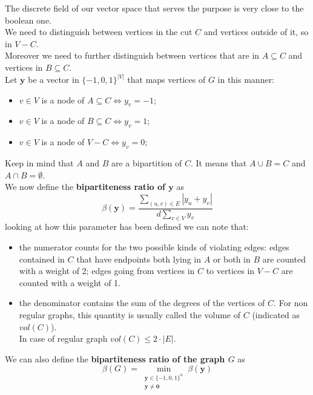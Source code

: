 The discrete field of our vector space that serves the purpose  is very close to the boolean one.\\
We need to distinguish between vertices in the cut $ C $ and vertices outside of it, so in $ V-C $.\\
Moreover we need to further distinguish between vertices that are in $ A \subseteq C $ and vertices in $ B \subseteq C $.\\
Let $ \mathbf{y} $ be a vector in $ \{-1,0,1\}^{|V|} $ that maps vertices of $ G $ in this manner: 
\begin{itemize}
\item $ v \in V $ is a node of $ A \subseteq C \iff y_v = -1 $;
\item $ v \in V $ is a node of $ B \subseteq C \iff y_v = 1 $;
\item $ v \in V $ is a node of $ V - C  \iff y_v = 0 $;
\end{itemize}
Keep in mind that $ A $ and $ B $ are a bipartition of $ C $. It means that $ A \cup B = C $ and $ A \cap B = \emptyset $. \\
We now define the \textbf{bipartiteness ratio of $ \mathbf{y} $} as
\[ \beta(\mathbf{y}) = \frac{\sum_{(u,v)\in E} |y_u+y_v|}{d \sum_{v \in V} y_v }  \]
looking at how this parameter has been defined we can note that:
\begin{itemize}
\item the numerator counts for the two possible kinds of violating edges: edges contained in $ C $ that have endpoints both lying in $ A $ or both in $ B $ are counted with a weight of 2; edges going from vertices in $ C $ to vertices in $ V-C $ are counted with a weight of 1.
\item the denominator contains the sum of the degrees of the vertices of $ C $. For non regular graphs, this quantity is usually called the volume of $ C $ (indicated as $ vol(C) $).\\ In case of regular graph $ vol(C) \leq 2\cdot|E| $.
\end{itemize}

We can also define the \textbf{bipartiteness ratio of the graph $ G $} as
\[ \beta(G) = \min_{\substack{\mathbf{y} \in \{-1,0,1\}^n \\ \mathbf{y} \ne \mathbf{0}}} \beta(\mathbf{y}) \]

